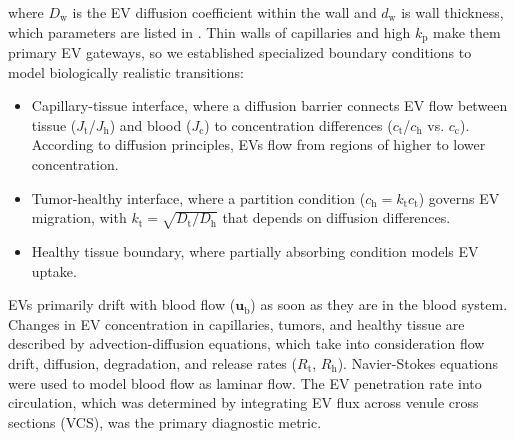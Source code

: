 \documentclass[sigconf]{acmart}
\begin{document}
where $D_{\mathrm{w}}$ is the EV diffusion coefficient within the wall and $d_{\mathrm{w}}$ is wall thickness, which parameters are listed in \cite{Zoofaghari_2023}. Thin walls of capillaries and high $k_{\mathrm{p}}$ make them primary EV gateways, so we established specialized boundary conditions to model biologically realistic transitions:
\begin{itemize}
  \item Capillary-tissue interface, where a diffusion barrier connects EV flow between tissue ($J_{\text{t}}$/$J_{\text{h}}$) and blood ($J_{\text{c}}$) to concentration differences ($c_{\text{t}}$/$c_{\text{h}}$ vs. $c_{\text{c}}$). According to diffusion principles, EVs flow from regions of higher to lower concentration.
  \item Tumor-healthy interface, where a partition condition ($c_{\text{h}} = k_{\text{t}}c_{\text{t}}$) governs EV migration, with $k_{\text{t}} = \sqrt{D_{\text{t}}/D_{\text{h}}}$ that depends on diffusion differences.
  \item Healthy tissue boundary, where partially absorbing condition models EV uptake.
\end{itemize}
EVs primarily drift with blood flow  ($\bm{u}_{\text{b}}$) as soon as they are in the blood system. Changes in EV concentration in capillaries, tumors, and healthy tissue are described by advection-diffusion equations, which take into consideration flow drift, diffusion, degradation, and release rates ($R_{\text{t}}$, $R_{\text{h}}$). Navier-Stokes equations were used to model blood flow as laminar flow. The EV penetration rate into circulation, which was determined by integrating EV flux across venule cross sections (VCS), was the primary diagnostic metric.
\end{document}
